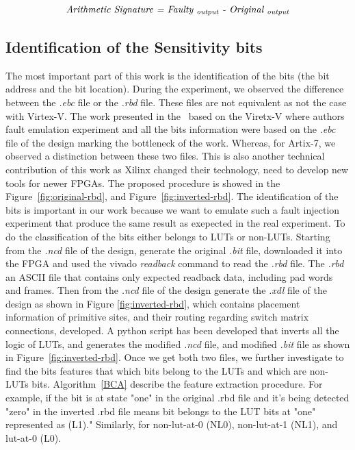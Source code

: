 \begin{equation} \label{eq:1}
\textit{Arithmetic Signature = Faulty \textsubscript{output} - Original \textsubscript{output}} 
\end{equation}

\subsection{Identification of the Sensitivity bits}
\label{SE-bits}

The most important part of this work is the identification of the bits (the bit address and the bit location). During the experiment, we observed the difference between the \textit{.ebc} file or the \textit{.rbd} file. These files are not equivalent as not the case with Virtex-V. The work presented in the~\cite{souari2015optimization} based on the Viretx-V where authors fault emulation experiment and all the bits information were based on the \textit{.ebc} file of the design marking the bottleneck of the work. Whereas, for Artix-7, we observed a distinction between these two files. This is also another technical contribution of this work as Xilinx changed their technology, need to develop new tools for newer FPGAs. The proposed procedure is showed in the Figure~\ref{fig:original-rbd}, and Figure~\ref{fig:inverted-rbd}. The identification of the bits is important in our work because we want to emulate such a fault injection experiment that produce the same result as exepected in the real experiment.
To do the classification of the bits either belongs to LUTs or non-LUTs. Starting from the \textit{.ncd} file of the design, generate the original \textit{.bit} file, downloaded it into the FPGA and used the vivado \textit{readback} command to read the \textit{.rbd} file. The \textit{.rbd} an ASCII file that contains only expected readback data, including pad words and frames. Then from the \textit{.ncd} file of the design generate the \textit{.xdl} file of the design as shown in Figure \ref{fig:inverted-rbd}, which contains placement information of primitive sites, and their routing regarding switch matrix connections, developed. A python script has been developed that inverts all the logic of LUTs, and generates the modified \textit{.ncd} file, and modified \textit{.bit} file as shown in Figure~\ref{fig:inverted-rbd}. Once we get both two files, we further investigate to find the bits features that which bits belong to the LUTs and which are non-LUTs bits. Algorithm~\ref{BCA} describe the feature extraction procedure. For example, if the bit is at state "one" in the original .rbd file and it's being detected "zero" in the inverted .rbd file means bit belongs to the LUT bits at "one" represented as (L1)." Similarly, for non-lut-at-0 (NL0), non-lut-at-1 (NL1), and lut-at-0 (L0). 




